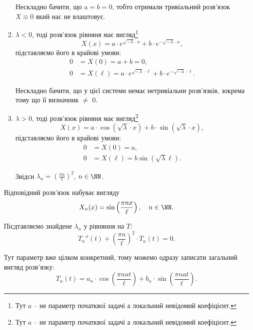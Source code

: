\begin{solution}
\begin{enumerate}
		Нескладно бачити, що $a = b = 0$, тобто отримали тривіальний розв'язок $X \equiv 0$ який нас не влаштовує.
		\item $\lambda < 0$, тоді розв'язок рівняня має вигляд\footnote{Тут $a$ -- не параметр початквої задачі а локальний невідомий коефіцієнт.} 
		\begin{equation*}
			X(x) = a \cdot e^{\sqrt{-\lambda} \cdot x} + b \cdot e^{-\sqrt{-\lambda} \cdot x},
		\end{equation*}
		підставляємо його в крайові умови:
		\begin{align*}
			0 &= X(0) = a + b = 0, \\
			0 &= X(\ell) = a \cdot e^{\sqrt{-\lambda} \cdot \ell} + b \cdot e^{-\sqrt{-\lambda} \cdot \ell}.
		\end{align*}

		Нескладно бачити, що у цієї системи немає нетривіальни розв'язків, зокрема тому що її визначник $\ne$ 0.
		\item $\lambda > 0$, тоді розв'язок рівняня має вигляд\footnote{Тут $a$ -- не параметр початквої задачі а локальний невідомий коефіцієнт.} 
		\begin{equation*}
			X(x) = a \cdot \cos \left( \sqrt{\lambda} \cdot x \right) + b \cdot \sin \left( \sqrt{\lambda} \cdot x \right),
		\end{equation*}
		підставляємо його в крайові умови:
		\begin{align*}
			0 &= X(0) = a, \\
			0 &= X(\ell) = b \sin \left( \sqrt{\lambda} \ell \right).
		\end{align*}

		Звідси $\lambda_n = \left( \frac{\pi n}{\ell} \right)^2$, $n \in \NN$. \\
	\end{enumerate}

	Відповідний розв'язок набуває вигляду
	\begin{equation*}
		X_n(x) = \sin \left( \frac{\pi n x}{\ell} \right), \quad n \in \NN.
	\end{equation*}

	Пісдтавляємо знайдене $\lambda_n$ у рівняння на $T$:
	\begin{equation*}
		T_n''(t) + \left( \frac{\pi n}{\ell} \right)^2 \cdot T_n(t) = 0.
	\end{equation*}

	Тут параметр вже цілком конкретний, тому можемо одразу записати загальний вигляд розв'язку:
	\begin{equation*}
		T_n(t) = a_n \cdot \cos \left( \frac{\pi n a t}{\ell} \right) + b_n \cdot \sin \left( \frac{\pi n a t}{\ell} \right).
	\end{equation*}
	

\end{solution}
